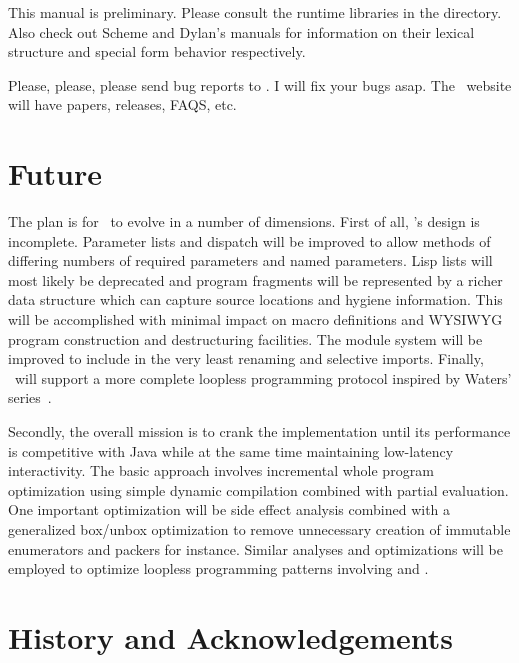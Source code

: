 \documentclass[twoside,twocolumn,9pt]{extarticle}
\begin{document}
This manual is preliminary.  Please consult the runtime
libraries in the  directory.  Also check out Scheme and Dylan's
manuals for information on their lexical structure and special form
behavior respectively.

Please, please, please send bug reports to .  I
will fix your bugs asap.  The \goo\ website 
will have papers, releases, FAQS, etc.

\section{Future}

The plan is for \goo\ to evolve in a number of dimensions.  First of
all, \goo's design is incomplete.  Parameter lists and dispatch will
be improved to allow methods of differing numbers of required
parameters and named parameters.  Lisp lists will most likely be
deprecated and program fragments will be represented by a richer data
structure which can capture source locations and hygiene information.
This will be accomplished with minimal impact on macro definitions and
WYSIWYG program construction and destructuring facilities.  The module
system will be improved to include in the very least renaming and selective
imports. Finally, \goo\ will support a more complete loopless
programming protocol inspired by Waters'
series~\cite{Waters:1991:ATS}.

Secondly, the overall mission is to crank the implementation until its
performance is competitive with Java while at the same time
maintaining low-latency interactivity.  The basic approach involves
incremental whole program optimization using simple dynamic
compilation combined with partial evaluation.  One important
optimization will be side effect analysis combined with a generalized
box/unbox optimization to remove unnecessary creation of immutable
enumerators and packers for instance.  Similar analyses and
optimizations will be employed to optimize loopless programming
patterns involving  and .

\section{History and Acknowledgements} 
\end{document}
